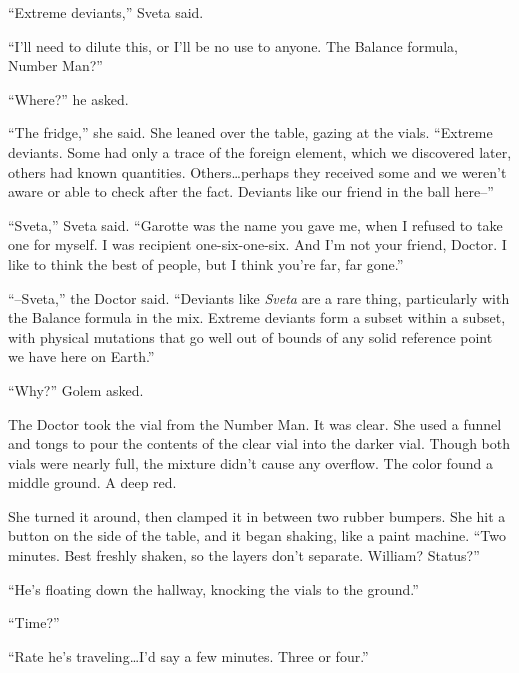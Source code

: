 ``Extreme deviants,'' Sveta said.



``I'll need to dilute this, or I'll be no use to anyone.  The Balance formula, Number Man?''



``Where?'' he asked.



``The fridge,'' she said.  She leaned over the table, gazing at the vials.  ``Extreme deviants.  Some had only a trace of the foreign element, which we discovered later, others had known quantities.  Others\ldots perhaps they received some and we weren't aware or able to check after the fact.  Deviants like our friend in the ball here--''



``Sveta,'' Sveta said.  ``Garotte was the name you gave me, when I refused to take one for myself.  I was recipient one-six-one-six.  And I'm not your friend, Doctor.  I like to think the best of people, but I think you're far, far gone.''



``--Sveta,'' the Doctor said.  ``Deviants like \emph{Sveta} are a rare thing, particularly with the Balance formula in the mix.  Extreme deviants form a subset within a subset, with physical mutations that go well out of bounds of any solid reference point we have here on Earth.''



``Why?''  Golem asked.



The Doctor took the vial from the Number Man.  It was clear.  She used a funnel and tongs to pour the contents of the clear vial into the darker vial.  Though both vials were nearly full, the mixture didn't cause any overflow.  The color found a middle ground.  A deep red.



She turned it around, then clamped it in between two rubber bumpers.  She hit a button on the side of the table, and it began shaking, like a paint machine.  ``Two minutes.  Best freshly shaken, so the layers don't separate.  William?  Status?''



``He's floating down the hallway, knocking the vials to the ground.''



``Time?''



``Rate he's traveling\ldots I'd say a few minutes.  Three or four.''



